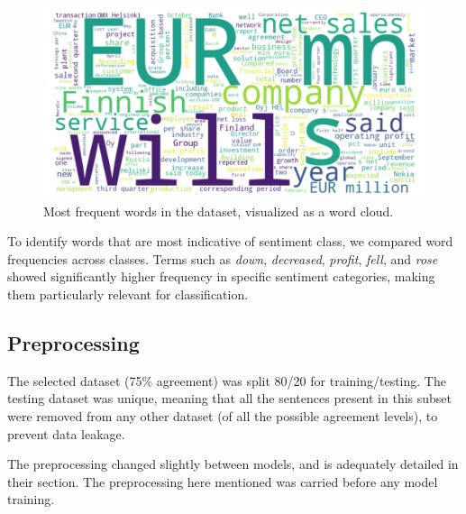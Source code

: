 \documentclass[conference]{IEEEtran}
\begin{document}

\begin{figure}[H]
    \centering
    \includegraphics[width=1\linewidth]{assets/word_cloud_75agree.png}
    \caption{Most frequent words in the dataset, visualized as a word cloud.}
    \label{fig:word_cloud_75agree}
\end{figure}

To identify words that are most indicative of sentiment class, we compared word frequencies across classes. Terms such as \textit{down}, \textit{decreased}, \textit{profit}, \textit{fell}, and \textit{rose} showed significantly higher frequency in specific sentiment categories, making them particularly relevant for classification.


\subsection{Preprocessing}

The selected dataset (75\% agreement) was split 80/20 for training/testing.
The testing dataset was unique, meaning that all the sentences present in this subset were removed from any other dataset (of all the possible agreement levels), to prevent data leakage.

The preprocessing changed slightly between models, and is adequately detailed in their section. The preprocessing here mentioned was carried before any model training.


\end{document}
